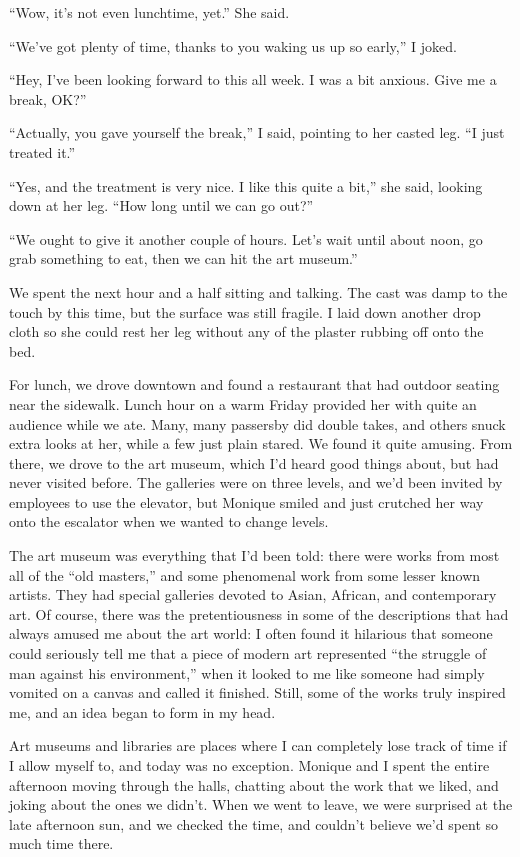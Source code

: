 ``Wow, it's not even lunchtime, yet.'' She said.

``We've got plenty of time, thanks to you waking us up so early,'' I joked.

``Hey, I've been looking forward to this all week. I was a bit anxious. Give me a break,
OK?''

``Actually, you gave yourself the break,'' I said, pointing to her casted leg. ``I just
treated it.''

``Yes, and the treatment is very nice. I like this quite a bit,'' she said, looking down at
her leg. ``How long until we can go out?''

``We ought to give it another couple of hours. Let's wait until about noon, go grab
something to eat, then we can hit the art museum.''

We spent the next hour and a half sitting and talking. The cast was damp to the touch by
this time, but the surface was still fragile. I laid down another drop cloth so she could rest
her leg without any of the plaster rubbing off onto the bed.

For lunch, we drove downtown and found a restaurant that had outdoor seating near the
sidewalk. Lunch hour on a warm Friday provided her with quite an audience while we ate. Many,
many passersby did double takes, and others snuck extra looks at her, while a few just plain
stared. We found it quite amusing. From there, we drove to the art museum, which I'd heard good
things about, but had never visited before. The galleries were on three levels, and we'd been
invited by employees to use the elevator, but Monique smiled and just crutched her way onto the
escalator when we wanted to change levels.

The art museum was everything that I'd been told: there were works from most all of the
``old masters,'' and some phenomenal work from some lesser known artists. They had special
galleries devoted to Asian, African, and contemporary art. Of course, there was the
pretentiousness in some of the descriptions that had always amused me about the art world: I
often found it hilarious that someone could seriously tell me that a piece of modern art
represented ``the struggle of man against his environment,'' when it looked to me like someone
had
simply vomited on a canvas and called it finished. Still, some of the works truly inspired me,
and an idea began to form in my head.

Art museums and libraries are places where I can completely lose track of time if I allow
myself to, and today was no exception. Monique and I spent the entire afternoon moving through
the halls, chatting about the work that we liked, and joking about the ones we didn't. When we
went to leave, we were surprised at the late afternoon sun, and we checked the time, and
couldn't believe we'd spent so much time there.

